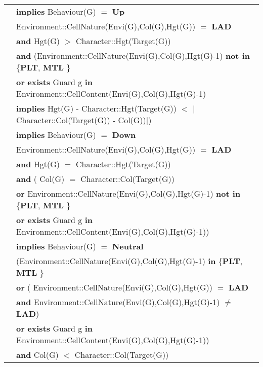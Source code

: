 \documentclass[8pt]{article}
\begin{document}
{\begin{longtable}{rl}
  & \quad\quad \textbf{implies} \textrm{Behaviour(G)} $=$ \textbf{Up} \\
  & \textrm{Environment::CellNature(Envi(G),Col(G),Hgt(G))} $=$ \textbf{LAD} \\
  & \quad\quad \textbf{and} \textrm{Hgt(G)} $>$ \textrm{Character::Hgt(Target(G))} \\
  & \quad\quad \textbf{and} (\textrm{Environment::CellNature(Envi(G),Col(G),Hgt(G)-1)} \textbf{not in} \{\textbf{PLT}, \textbf{MTL}  \} \\
  & \quad\quad\quad\quad \textbf{or} \textbf{exists} \textrm{Guard} g \textbf{in} \textrm{Environment::CellContent(Envi(G),Col(G),Hgt(G)-1)} \\
  & \quad\quad\quad\quad \textbf{implies} \textrm{Hgt(G) - Character::Hgt(Target(G))} $<$ $|$\textrm{Character::Col(Target(G)) - Col(G)})$|$)\\
  & \quad\quad \textbf{implies} \textrm{Behaviour(G)} $=$ \textbf{Down} \\
  & \textrm{Environment::CellNature(Envi(G),Col(G),Hgt(G))} $=$ \textbf{LAD} \\
  & \quad\quad \textbf{and} \textrm{Hgt(G)} $=$ \textrm{Character::Hgt(Target(G))} \\
  & \quad\quad \textbf{and} ( \textrm{Col(G)} $=$ \textrm{Character::Col(Target(G))}\\
  & \quad\quad\quad\quad \textbf{or} \textrm{Environment::CellNature(Envi(G),Col(G),Hgt(G)-1)} \textbf{not in} \{\textbf{PLT}, \textbf{MTL}  \} \\
  & \quad\quad\quad\quad \textbf{or} \textbf{exists} \textrm{Guard} g \textbf{in} \textrm{Environment::CellContent(Envi(G),Col(G),Hgt(G)-1)}) \\
  & \quad\quad \textbf{implies} \textrm{Behaviour(G)} $=$ \textbf{Neutral} \\
  & (\textrm{Environment::CellNature(Envi(G),Col(G),Hgt(G)-1)} \textbf{in} \{\textbf{PLT}, \textbf{MTL}  \} \\
  & \quad\quad\quad\quad \textbf{or} ( \textrm{Environment::CellNature(Envi(G),Col(G),Hgt(G))} $=$ \textbf{LAD} \\
  & \quad\quad\quad\quad\quad\quad \textbf{and} \textrm{Environment::CellNature(Envi(G),Col(G),Hgt(G)-1)} $\neq$ \textbf{LAD}) \\
  & \quad\quad\quad\quad \textbf{or} \textbf{exists} \textrm{Guard} g \textbf{in} \textrm{Environment::CellContent(Envi(G),Col(G),Hgt(G)-1)}) \\
  & \quad\quad \textbf{and} \textrm{Col(G)} $<$ \textrm{Character::Col(Target(G))} \\

\end{longtable}}
\end{document}
